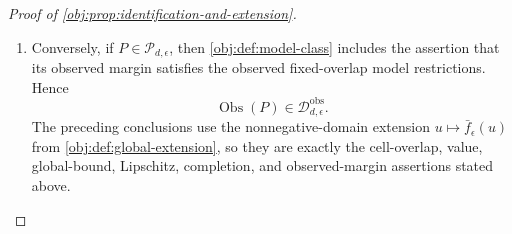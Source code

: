 \begin{proof}[Proof of \cref{obj:prop:identification-and-extension}]
\begin{enumerate}
The construction gives consistency because atoms with \(y\ne y_a\) have mass zero.  Its observed
margin is \(\mathbb P\), since
\[
\sum_{y_0,y_1\in\{0,1\}}P^{\mathrm B}(x,a,y,y_0,y_1)
=
q_{ay,x}\sum_{y_{1-a}\in\{0,1\}}\operatorname{bm}(\mu_{1-a,x},y_{1-a})
=q_{ay,x}.
\]
Using the observed-law factorization supplied by \cref{obj:def:observed-model-class},
\[
q_{ay,x}
=
p_x\,\operatorname{bm}(\pi_x,a)\,\operatorname{bm}(\mu_{ax},y),
\]
the potential-outcome atom obtained after summing over the observed outcome factors as
\[
\sum_{y\in\{0,1\}}P^{\mathrm B}(x,a,y,y_0,y_1)
=
p_x\,\operatorname{bm}(\pi_x,a)\,\operatorname{bm}(\mu_{0x},y_0)\,\operatorname{bm}(\mu_{1x},y_1).
\]
Consequently, conditionally on \(X=x\), treatment is Bernoulli with parameter \(\pi_x\), independent
of the joint potential-outcome vector, and \(Y(0),Y(1)\) are independent Bernoulli variables with
parameters \(\mu_{0x}\) and \(\mu_{1x}\).  The observed margin is \(\mathbb P\), so its overlap
properties are exactly those of the given observed law; together with consistency and conditional
exchangeability, \cref{obj:def:model-class} places \(P^{\mathrm B}\) in \(\mathcal P_{d,\epsilon}\). %

\item Conversely, if \(P\in\mathcal P_{d,\epsilon}\), then \cref{obj:def:model-class} includes the
assertion that its observed margin satisfies the observed fixed-overlap model restrictions.  Hence
\[
\operatorname{Obs}(P)\in\mathcal D_{d,\epsilon}^{\mathrm{obs}}.
\]
The preceding conclusions use the nonnegative-domain extension \(u\mapsto\bar f_\epsilon(u)\) from
\cref{obj:def:global-extension}, so they are exactly the cell-overlap, value, global-bound,
Lipschitz, completion, and observed-margin assertions stated above. %
\end{enumerate}
\end{proof}

